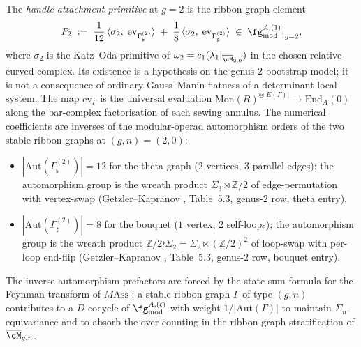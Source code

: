 \begin{definition}[Handle-attachment primitive at \(g = 2\)]
\label{def:handle-attachment-primitive-g2}
The \emph{handle-attachment primitive} at \(g = 2\) is the
ribbon-graph element
\[
 P_{2}
 \;:=\;
 \frac{1}{12}\,\langle \sigma_{2},\;
 \mathrm{ev}_{\Gamma^{(2)}_{\flat}}\rangle
 \;+\;
 \frac{1}{8}\,\langle \sigma_{2},\;
 \mathrm{ev}_{\Gamma^{(2)}_{\sharp}}\rangle
 \;\in\;
 \fg^{A,(1)}_{\mathrm{mod}}\big|_{g = 2},
\]
where \(\sigma_{2}\) is the Katz--Oda primitive of
\(\omega_{2} = c_{1}(\lambda_{1}|_{\overline{\cM}_{2,0}})\) in the
chosen relative curved complex. Its existence is a hypothesis on
the genus-\(2\) bootstrap model; it is not a consequence of
ordinary Gauss--Manin flatness of a determinant local system.
The map \(\mathrm{ev}_{\Gamma}\) is the
universal evaluation
\(\mathrm{Mon}(R)^{\otimes |E(\Gamma)|} \to \mathrm{End}_{A}(0)\)
along the bar-complex factorisation of each sewing annulus. The
numerical coefficients are inverses of the modular-operad
automorphism orders of the two stable ribbon graphs at
\((g, n) = (2, 0)\):
\begin{itemize}
\item \(|\mathrm{Aut}(\Gamma^{(2)}_{\flat})| = 12\) for the theta
 graph (\(2\) vertices, \(3\) parallel edges); the automorphism
 group is the wreath product
 \(\Sigma_{3} \rtimes \mathbb{Z}/2\) of edge-permutation with
 vertex-swap (Getzler--Kapranov \cite{GeK98}, Table~5.3,
 genus-\(2\) row, theta entry).
\item \(|\mathrm{Aut}(\Gamma^{(2)}_{\sharp})| = 8\) for the
 bouquet (\(1\) vertex, \(2\) self-loops); the automorphism
 group is the wreath product
 \(\mathbb{Z}/2 \wr \Sigma_{2} = \Sigma_{2} \ltimes (\mathbb{Z}/2)^{2}\)
 of loop-swap with per-loop end-flip (Getzler--Kapranov
 \cite{GeK98}, Table~5.3, genus-\(2\) row, bouquet entry).
\end{itemize}
The inverse-automorphism prefactors are forced by the
state-sum formula for the Feynman transform of \(M\mathrm{Ass}\)
\cite[Theorem~5.4]{GeK98}: a stable ribbon graph \(\Gamma\) of
type \((g, n)\) contributes to a \(D\)-cocycle of
\(\fg^{A,(\ell)}_{\mathrm{mod}}\) with weight
\(1/|\mathrm{Aut}(\Gamma)|\) to maintain
\(\Sigma_{n}\)-equivariance and to absorb the over-counting in the
ribbon-graph stratification of \(\overline{\cM}_{g, n}\).
\end{definition}

